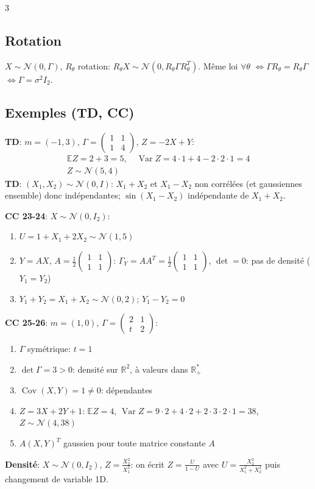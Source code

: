 \documentclass[12pt, a4paper]{article}
\newcommand{\E}{\mathbb{E}}
\newcommand{\R}{\mathbb{R}}
\newcommand{\Var}{\operatorname{Var}}
\newcommand{\Cov}{\operatorname{Cov}}
\begin{document}
\begin{multicols*}{3}
	\subsection{Rotation}
	$X\sim\mathcal N(0,\Gamma)$, $R_\theta$ rotation: $R_\theta X\sim\mathcal N(0,R_\theta\Gamma R_\theta^T)$. Même loi $\forall\theta$ $\iff\Gamma R_\theta=R_\theta\Gamma$ $\iff\Gamma=\sigma^2I_2$.

	\colbreak
	\subsection{Exemples (TD, CC)}
	\textbf{TD}: $m=(-1,3)$, $\Gamma=\begin{pmatrix}1&1\\1&4\end{pmatrix}$, $Z=-2X+Y$:
	\begin{gather*}
		\E Z=2+3=5,\quad\Var Z=4\cdot1+4-2\cdot2\cdot1=4\\ Z\sim\mathcal N(5,4)
	\end{gather*}
	\textbf{TD}: $(X_1,X_2)\sim\mathcal N(0,I)$: $X_1+X_2$ et $X_1-X_2$ non corrélées (et gaussiennes ensemble) donc indépendantes; $\sin(X_1-X_2)$ indépendante de $X_1+X_2$.

	\textbf{CC 23-24}: $X\sim\mathcal N(0,I_2)$:
	\begin{enumerate}[\roman*.]
		\item $U=1+X_1+2X_2\sim\mathcal N(1,5)$
		\item $Y=AX$, $A=\frac12\begin{pmatrix}1&1\\1&1\end{pmatrix}$: $\Gamma_Y=AA^T=\frac12\begin{pmatrix}1&1\\1&1\end{pmatrix}$, $\det=0$: pas de densité ($Y_1=Y_2$)
		\item $Y_1+Y_2=X_1+X_2\sim\mathcal N(0,2)$; $Y_1-Y_2=0$
	\end{enumerate}
	\textbf{CC 25-26}: $m=(1,0)$, $\Gamma=\begin{pmatrix}2&1\\t&2\end{pmatrix}$:
	\begin{enumerate}[\roman*.]
		\item $\Gamma$ symétrique: $t=1$
		\item $\det\Gamma=3>0$: densité sur $\R^2$, à valeurs dans $\R_+^*$
		\item $\Cov(X,Y)=1\neq0$: dépendantes
		\item $Z=3X+2Y+1$: $\E Z=4$, $\Var Z=9\cdot2+4\cdot2+2\cdot3\cdot2\cdot1=38$, $Z\sim\mathcal N(4,38)$
		\item $A(X,Y)^T$ gaussien pour toute matrice constante $A$
	\end{enumerate}
	\textbf{Densité}: $X\sim\mathcal N(0,I_2)$, $Z=\frac{X_2^2}{X_1^2}$: on écrit $Z=\frac{U}{1-U}$ avec $U=\frac{X_2^2}{X_1^2+X_2^2}$ puis changement de variable 1D.


\end{multicols*}
\end{document}
